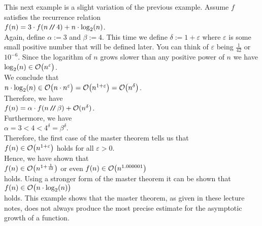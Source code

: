 \example
This next example is a slight variation of the previous example.  Assume $f$ satisfies the recurrence relation 
\\[0.2cm]
\hspace*{1.3cm}
$f(n) = 3 \cdot f(n \mbox{\,\texttt{/}$\!$\texttt{/}\,} 4) + n \cdot \log_2(n)$.
\\[0.2cm]
Again, define $\alpha := 3$ and $\beta := 4$.  This time we define $\delta := 1 + \varepsilon$ where
$\varepsilon$ is some small positive number that will be defined later.  You can think of $\varepsilon$ being 
 $\frac{1}{42}$ or $10^{-6}$.  Since the logarithm of $n$ grows slower than any positive power of $n$ we have
\\[0.2cm]
\hspace*{1.3cm}
$\log_2(n) \in \mathcal{O}\bigl(n^\varepsilon\bigr)$.
\\[0.2cm]
We conclude that
\\[0.2cm]
\hspace*{1.3cm}
$n \cdot \log_2(n) \in \mathcal{O}\bigl(n \cdot n^\varepsilon\bigr) = \mathcal{O}\bigl(n^{1+\varepsilon}\bigr) = \mathcal{O}\bigl(n^\delta\bigr)$.
\\[0.2cm]
Therefore, we have
\\[0.2cm]
\hspace*{1.3cm}
$f(n) = \alpha \cdot f(n \mbox{\,\texttt{/}$\!$\texttt{/}\,} \beta) + \mathcal{O}(n^\delta)$.
\\[0.2cm]
Furthermore, we have
\\[0.2cm]
\hspace*{1.3cm}
$\alpha = 3 < 4 < 4^\delta = \beta^\delta$.
\\[0.2cm]
Therefore, the first case of the master theorem tells us that
\\[0.2cm]
\hspace*{1.3cm}
$f(n) \in \mathcal{O}\bigl(n^{1+\varepsilon}\bigr)$ \quad holds for all $\varepsilon > 0$.
\\[0.2cm]
Hence, we have shown that
\\[0.2cm]
\hspace*{1.3cm}
$f(n) \in \mathcal{O}\bigl(n^{1+\frac{1}{42}}\bigr)$ \quad or even \quad $f(n) \in \mathcal{O}\bigl(n^{1.000001}\bigr)$
\\[0.2cm]
holds.  Using a stronger form of the master theorem it can be shown that
\\[0.2cm]
\hspace*{1.3cm}
$f(n) \in \mathcal{O}\bigl(n \cdot \log_2(n)\bigr)$
\\[0.2cm]
holds.  This example shows that the master theorem, as given in these lecture notes, does not always
produce the most precise estimate for the asymptotic growth of a function.

